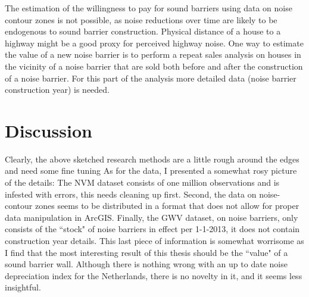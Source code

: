 \documentclass[]{scrartcl}
\begin{document}
The estimation of the willingness to pay for sound barriers using data on noise contour zones is not possible, as noise reductions over time are likely to be endogenous to sound barrier construction. Physical distance of a house to a highway might be a good proxy for perceived highway noise. One way to estimate the value of a new noise barrier is to perform a repeat sales analysis on houses in the vicinity of a noise barrier that are sold both before and after the construction of a noise barrier. For this part of the analysis more detailed data (noise barrier construction year) is needed.

\section{Discussion}

Clearly, the above sketched research methods are a little rough around the edges and need some fine tuning As for the data, I presented a somewhat rosy picture of the details: The NVM dataset consists of one million observations and is infested with errors, this needs cleaning up first. Second, the data on noise-contour zones seems to be distributed in a format that does not allow for proper data manipulation in ArcGIS. Finally, the GWV dataset, on noise barriers, only consists of the ``stock" of noise barriers in effect per 1-1-2013, it does not contain construction year details. This last piece of information is somewhat worrisome as I find that the most interesting result of this thesis should be the ``value" of a sound barrier wall. Although there is nothing wrong with an up to date noise depreciation index for the Netherlands, there is no novelty in it, and it seems less insightful.



\end{document}
